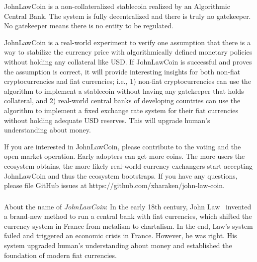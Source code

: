 \documentclass[dvipdfmx,a4paper]{article}
\begin{document}
JohnLawCoin is a non-collateralized stablecoin realized by an Algorithmic Central Bank. The system is fully decentralized and there is truly no gatekeeper. No gatekeeper means there is no entity to be regulated.

JohnLawCoin is a real-world experiment to verify one assumption that there is a way to stabilize the currency price with algorithmically defined monetary policies without holding any collateral like USD. If JohnLawCoin is successful and proves the assumption is correct, it will provide interesting insights for both non-fiat cryptocurrencies and fiat currencies; i.e., 1) non-fiat cryptocurrencies can use the algorithm to implement a stablecoin without having any gatekeeper that holds collateral, and 2) real-world central banks of developing countries can use the algorithm to implement a fixed exchange rate system for their fiat currencies without holding adequate USD reserves. This will upgrade human's understanding about money.

If you are interested in JohnLawCoin, please contribute to the voting and the open market operation. Early adopters can get more coins. The more users the ecosystem obtains, the more likely real-world currency exchangers start accepting JohnLawCoin and thus the ecosystem bootstraps. If you have any questions, please file GitHub issues at https://github.com/xharaken/john-law-coin.

\subsubsection*{}

About the name of \textit{JohnLawCoin}: In the early 18th century, John Law~\cite{davies2010history,ferguson2008ascent,iwai1997evolution} invented a brand-new method to run a central bank with fiat currencies, which shifted the currency system in France from metalism to chartalism. In the end, Law's system failed and triggered an economic crisis in France. However, he was right. His system upgraded human's understanding about money and established the foundation of modern fiat currencies.



\end{document}
